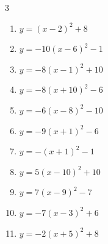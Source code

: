 \begin{multicols}{3}
\begin{enumerate}
  \item $\displaystyle y=\left( x-2\right)^{2}+8$

        \phantom{$\displaystyle 頂点\left( 2 , 8 \right)$}

\columnbreak %

  \item $\displaystyle y=-10\left( x-6\right)^{2}-1$

        \phantom{$\displaystyle 頂点\left( 6 , -1 \right)$}

  \item $\displaystyle y=-8\left( x-1\right)^{2}+10$

        \phantom{$\displaystyle 頂点\left( 1 , 10 \right)$}

  \item $\displaystyle y=-8\left( x+10\right)^{2}-6$

        \phantom{$\displaystyle 頂点\left( -10 , -6 \right)$}

  \item $\displaystyle y=-6\left( x-8\right)^{2}-10$

        \phantom{$\displaystyle 頂点\left( 8 , -10 \right)$}

  \item $\displaystyle y=-9\left( x+1\right)^{2}-6$

        \phantom{$\displaystyle 頂点\left( -1 , -6 \right)$}

  \item $\displaystyle y=-\left( x+1\right)^{2}-1$

        \phantom{$\displaystyle 頂点\left( -1 , -1 \right)$}

  \item $\displaystyle y=5\left( x-10\right)^{2}+10$

        \phantom{$\displaystyle 頂点\left( 10 , 10 \right)$}

  \item $\displaystyle y=7\left( x-9\right)^{2}-7$

        \phantom{$\displaystyle 頂点\left( 9 , -7 \right)$}

  \item $\displaystyle y=-7\left( x-3\right)^{2}+6$

        \phantom{$\displaystyle 頂点\left( 3 , 6 \right)$}

  \item $\displaystyle y=-2\left( x+5\right)^{2}+8$

        \phantom{$\displaystyle 頂点\left( -5 , 8 \right)$}


\end{enumerate}
\end{multicols}
